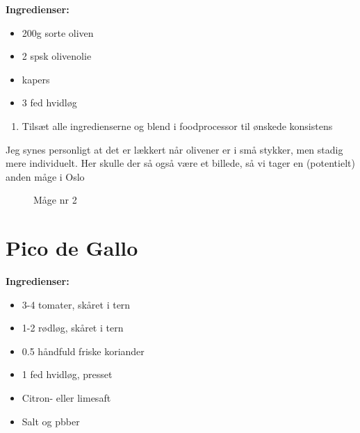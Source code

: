 \documentclass{book}
\begin{document}
\begin{minipage}[t]{0.5\textwidth}
\textbf{Ingredienser:}
\begin{itemize}
    \item 200g sorte oliven
    \item 2 spsk olivenolie
    \item kapers
    \item 3 fed hvidløg
\end{itemize}
\end{minipage}
\begin{minipage}[t]{0.5\textwidth}
\begin{enumerate}
    \item Tilsæt alle ingredienserne og blend i foodprocessor til ønskede konsistens
\end{enumerate}
\end{minipage}
Jeg synes personligt at det er lækkert når olivener er i små stykker, men stadig mere individuelt.
\newpage Her skulle der så også være et billede, så vi tager en (potentielt) anden måge i Oslo
\begin{figure}
    \centering
    \caption{Måge nr 2}
\end{figure}
\newpage \section{Pico de Gallo}
\begin{minipage}[t]{0.5\textwidth}
\textbf{Ingredienser:}
\begin{itemize}
    \item 3-4 tomater, skåret i tern
    \item 1-2 rødløg, skåret i tern
    \item 0.5 håndfuld friske koriander
    \item 1 fed hvidløg, presset
    \item Citron- eller limesaft
    \item Salt og pbber
\end{itemize}
\end{minipage}
\end{document}

